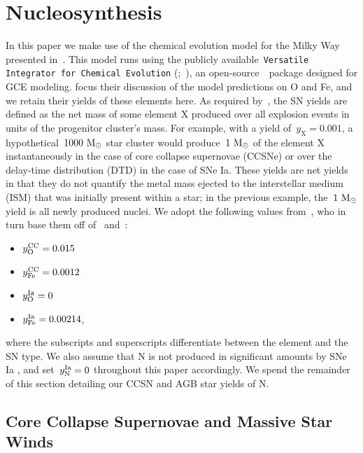 \documentclass[ms.tex]{subfiles}
\begin{document}
\section{Nucleosynthesis}
\label{sec:yields}

In this paper we make use of the chemical evolution model for the Milky Way
presented in~\citet{Johnson2021}.
This model runs using the publicly available~\texttt{Versatile Integrator for
Chemical Evolution} (\vice;~\citealp{Johnson2020, Griffith2021a, Johnson2021}),
an open-source~\python~package designed for GCE modeling.
\citet{Johnson2021} focus their discussion of the model predictions on O and
Fe, and we retain their yields of these elements here.
As required by~\vice, the SN yields are defined as the net mass of some element
X produced over all explosion events in units of the progenitor cluster's
mass.
For example, with a yield of~$y_\text{X} = 0.001$, a hypothetical~$1000~\text{M}_\odot$
star cluster would produce~$1~\text{M}_\odot$ of the element X instantaneously in the
case of core collapse supernovae (CCSNe) or over the delay-time distribution
(DTD) in the case of SNe Ia.
These yields are net yields in that they do not quantify the metal mass
ejected to the interstellar medium (ISM) that was initially present within a
star; in the previous example, the~$1~\text{M}_\odot$ yield is all newly produced nuclei.
We adopt the following values from~\citet{Johnson2021}, who in turn base them
off of~\citet*{Weinberg2017} and~\citet{Johnson2020}:
\begin{itemize}
	\item $y_\text{O}^\text{CC} = 0.015$

	\item $y_\text{Fe}^\text{CC} = 0.0012$

	\item $y_\text{O}^\text{Ia} = 0$

	\item $y_\text{Fe}^\text{Ia} = 0.00214$,
\end{itemize}
where the subscripts and superscripts differentiate between the element and the
SN type.
We also assume that N is not produced in significant amounts by SNe Ia
\citep{Johnson2019}, and set~$y_\text{N}^\text{Ia} = 0$ throughout this paper
accordingly.
We spend the remainder of this section detailing our CCSN and AGB star yields
of N.

\subsection{Core Collapse Supernovae and Massive Star Winds}
\label{sec:yields:ccsne}
\end{document}
